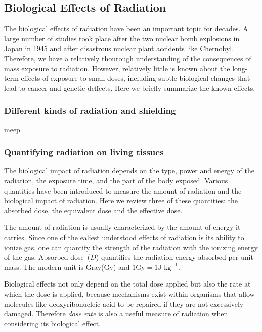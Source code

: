 \documentclass[preprint,aip,pra]{revtex4-1}
\begin{document}
    \subsection{Biological Effects of Radiation}
        The biological effects of radiation have been an important topic for decades. A large
        number of studies took place after the two nuclear bomb explosions in Japan in 1945
        and after disastrous nuclear plant accidents like Chernobyl. Therefore, we have a relatively
        thourough understanding of the consequences of mass exposure to radiation. However, relatively
        little is known about the long-term effects of exposure to small doses, including subtle biological
        changes that lead to cancer and genetic deffects. Here we briefly summarize the known effects.
        \subsubsection{Different kinds of radiation and shielding}
        meep
        \subsubsection{Quantifying radiation on living tissues}
        The biological impact of radiation depends on the type, power and energy of the radiation, the
        exposure time, and the part of the body exposed. Various quantities have been introduced to
        measure the amount of radiation and the biological impact of radiation. Here we review three
        of these quantities: the absorbed dose, the equivalent dose and the effective dose.

        The amount of radiation is usually characterized by the amount of energy it carries. Since one of
        the ealiest understood effects of radiation is its ability to ionize gas, one can quantify the
        strength of the radiation with the ionizing energy of the gas.
        Absorbed dose~($D$) quantifies the 
        radiation energy absorbed per unit mass. The modern unit is Gray(Gy)
        and $1\text{Gy}=1\text{J kg}^{-1}$.\cite{u16}

        Biological effects not only depend on the total dose applied but also the rate at which the 
        dose is applied, because mechanisms exist within organisms that allow molecules like deoxyribonucleic acid
        to be repaired if they are not excessively damaged. Therefore {\it dose rate} is also a useful
        measure of radiation when considering its biological effect.
\end{document}

